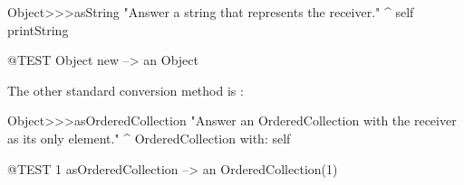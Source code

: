 \documentclass[a4paper,10pt,twoside]{book}
\begin{document}
\begin{code}{}
Object>>>asString
    "Answer a string that represents the receiver."
    ^ self printString
\end{code}

\begin{code}{@TEST}
Object new --> an Object
\end{code}

The other standard conversion method is :

\begin{code}{}
Object>>>asOrderedCollection
    "Answer an OrderedCollection with the receiver as its only element."
    ^ OrderedCollection with: self
\end{code}

\begin{code}{@TEST}
1 asOrderedCollection --> an OrderedCollection(1)
\end{code}


\ifx\wholebook\relax\else
\end{document}
